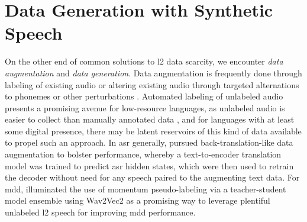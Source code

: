 \documentclass[thesis]{cluu}
\begin{document}
\section{Data Generation with Synthetic Speech}
On the other end of common solutions to \gls{l2} data scarcity, we encounter \textit{data augmentation} and \textit{data generation}. Data augmentation is frequently done through labeling of existing audio \parencite[see][inter alia]{xuIterativePseudoLabelingSpeech2020,yangImprovingMispronunciationDetection2022,barteldsMakingMoreLittle2023} or altering existing audio through targeted alternations to phonemes or other perturbations \parencite{kheirAutomaticPronunciationAssessment2023}. Automated labeling of unlabeled audio presents a promising avenue for low-resource languages, as unlabeled audio is easier to collect than manually annotated data \parencite{barteldsMakingMoreLittle2023}, and for languages with at least some digital presence, there may be latent reservoirs of this kind of data available to propel such an approach. In \gls{asr} generally, \textcite{hayashiBackTranslationStyleDataAugmentation2018} pursued back-translation-like data augmentation to bolster performance, whereby a text-to-encoder translation model was trained to predict \gls{asr} hidden states, which were then used to retrain the decoder without need for any speech paired to the augmenting text data. For \gls{mdd}, \textcite{yangImprovingMispronunciationDetection2022} illuminated the use of momentum pseudo-labeling via a teacher-student model ensemble using Wav2Vec2 as a promising way to leverage plentiful unlabeled \gls{l2} speech for improving \gls{mdd} performance.
\end{document}
